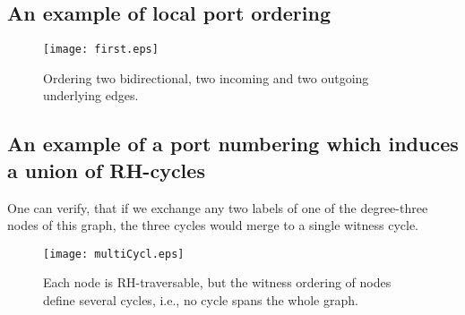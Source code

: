 \documentclass[11pt,envcountsame,oribibl]{llncs}
\begin{document}
\subsection{An example of local port ordering}
\begin{figure}[htb] \centering
   \texttt{[image: first.eps]}
   \caption{Ordering two bidirectional, two incoming and two outgoing underlying edges.}
   \label{Fig:first}
\end{figure}



\subsection{An example of a port numbering which induces a union of RH-cycles}
One can verify, that
if we exchange any two labels of one of the degree-three
nodes of this graph, the three cycles would merge to a single witness cycle.

\begin{figure}[h]
\texttt{[image: multiCycl.eps]}
\centering
\caption{Each node is RH-traversable, but the witness
ordering of nodes define several cycles, i.e., no cycle spans the whole graph.}
\label{Fig:2cycl}
\end{figure}
\end{document}
